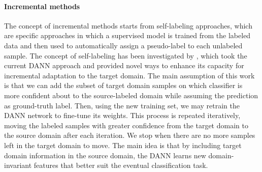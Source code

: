 \paragraph{Incremental methods}
The concept of incremental methods starts from self-labeling approaches, which are specific approaches in which a supervised model is trained from the labeled data and then used to automatically assign a  pseudo-label to each unlabeled sample. The concept of self-labeling has been investigated by \cite[Gallego et al.]{Gallego2020}, which took the current DANN approach \cite{Ganin2015} and provided novel ways to enhance its capacity for incremental adaptation to the target domain. The main assumption of this work is that we can add the subset of target domain samples on which classifier is more confident about to the source-labeled domain while assuming the prediction as ground-truth label.
Then, using the new training set, we may retrain the DANN network to fine-tune its weights. This process is repeated iteratively, moving the labeled samples with greater confidence from the target domain to the source domain after each iteration. We stop when there are no more samples left in the target domain to move.
The main idea is that by including target domain information in the source domain, the DANN learns new domain-invariant features that better suit the eventual classification task.
